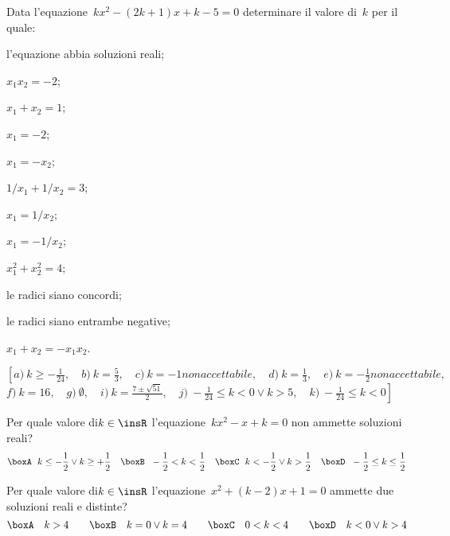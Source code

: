 \begin{esercizio}[\Ast]
 \label{ese:3.104}
Data l'equazione~$kx^{2}-(2k + 1) x + k-5 = 0$ determinare il valore di~$k$ per 
il quale:
\begin{multicols}{2}
\begin{enumeratea}
\item l'equazione abbia soluzioni reali;
\item $x_1 x_2=-2$;
\item $x_1 + x_2 = 1$;
\item $x_1 = -2$;
\item $x_1 = -x_2$;
\item $1/x_1 + 1/x_2 = 3$;
\item $x_1 = 1/x_2$;
\item $x_1 = -1/x_2$;
\item $x_1^2 + x_2^2 = 4$;
\item le radici siano concordi;
\item le radici siano entrambe negative;
\item $x_1 + x_2 = - x_1 x_2$.
\end{enumeratea}
\end{multicols}
\end{esercizio}

\begin{flushright}
$\left[a)~ k \geq-\frac{1}{24} ,\quad b)~ k = \frac{5}{3} ,\quad 
c)~ k=-1  non accettabile,\quad d)~ k = \frac{1}{3} ,\quad e)~ k 
=-\frac{1}{2} non accettabile,\quad \right.$
$\left.f)~ k = 16 ,\quad g)~ \emptyset ,\quad 
i)~ k = \frac{7 \pm \sqrt{51}}{2} ,\quad j)~ - \frac{1}{24} \leq k < 0 \vee k 
> 5 ,\quad k)~ - \frac{1}{24} \leq k < 0 \right]$
\end{flushright}

\begin{esercizio}
 \label{ese:3.105}
 Per quale valore di$k \in \insR$ l'equazione~$kx^{2}-x + k = 0$ non ammette 
soluzioni reali?
\[\boxA\;~ k \leq-\frac{1}{2} \vee k \geq + \frac{1}{2}\quad\boxB\;~ - \frac{1}{2} 
< k < \frac{1}{2}\quad\boxC\;~ k <-\frac{1}{2} \vee k > \frac{1}{2}\quad\boxD\;~ - 
\frac{1}{2} \leq k \leq \frac{1}{2}\]
\end{esercizio}

\begin{esercizio}
 \label{ese:3.106}
Per quale valore di$k \in \insR$ l'equazione~$x^{2} + (k-2) x + 1 = 0$ ammette 
due soluzioni reali e distinte?
\[\boxA\quad k > 4\qquad\boxB\quad k = 0 \vee k = 4\qquad\boxC\quad 0 < k < 
4\qquad\boxD\quad k < 0 \vee k > 4\]
\end{esercizio}

